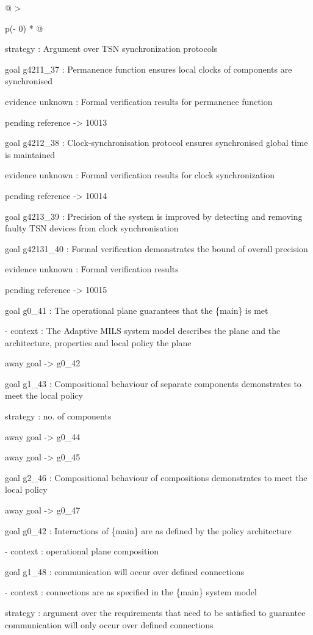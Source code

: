 \documentclass[12pt,twoside,a4paper]{article}
\begin{document}
\begin{longtable}[]{@{}
  >{\raggedright\arraybackslash}p{(\columnwidth - 0\tabcolsep) * }@{}}
\begin{minipage}[b]{\linewidth}
strategy : Argument over TSN synchronization protocols

goal g4211\_37 : Permanence function ensures local clocks of components are synchronised

evidence unknown : Formal verification results for permanence function

pending reference -\textgreater{} 10013

goal g4212\_38 : Clock-synchronisation protocol ensures synchronised global time is maintained

evidence unknown : Formal verification results for clock synchronization

pending reference -\textgreater{} 10014

goal g4213\_39 : Precision of the system is improved by detecting and removing faulty TSN devices from clock synchronisation

goal g42131\_40 : Formal verification demonstrates the bound of overall precision

evidence unknown : Formal verification results

pending reference -\textgreater{} 10015

goal g0\_41 : The operational plane guarantees that the \{main\} is met

- context : The Adaptive MILS system model describes the plane and the architecture, properties and local policy the plane

away goal -\textgreater{} g0\_42

goal g1\_43 : Compositional behaviour of separate components demonstrates to meet the local policy

strategy : no. of components

away goal -\textgreater{} g0\_44

away goal -\textgreater{} g0\_45

goal g2\_46 : Compositional behaviour of compositions demonstrates to meet the local policy

away goal -\textgreater{} g0\_47

goal g0\_42 : Interactions of \{main\} are as defined by the policy architecture

- context : operational plane \textbar{} composition

goal g1\_48 : communication will occur over defined connections

- context : connections are as specified in the \{main\} system model

strategy : argument over the requirements that need to be satisfied to guarantee communication will only occur over defined connections


\end{minipage}
\end{longtable}
\end{document}
